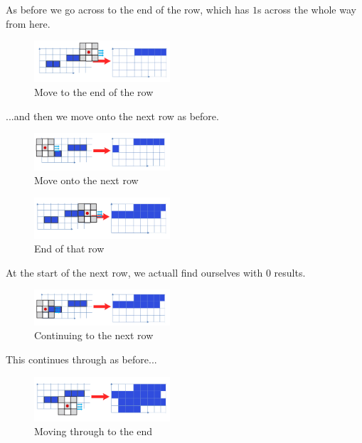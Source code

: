 \documentclass{article}
\begin{document}
As before we go across to the end of the row, which has $1$s across the whole way from here.

\begin{figure}[H]
    \centering
    \includegraphics[width = 0.45\textwidth]{imgs/5/b3.png}
    \caption{Move to the end of the row}
    \label{fig:b3}
\end{figure}

...and then we move onto the next row as before.

\begin{figure}[H]
    \centering
    \includegraphics[width = 0.45\textwidth]{imgs/5/b4.png}
    \caption{Move onto the next row}
    \label{fig:b4}
\end{figure}

\begin{figure}[H]
    \centering
    \includegraphics[width = 0.45\textwidth]{imgs/5/b5.png}
    \caption{End of that row}
    \label{fig:b5}
\end{figure}

At the start of the next row, we actuall find ourselves with $0$ results.

\begin{figure}[H]
    \centering
    \includegraphics[width = 0.45\textwidth]{imgs/5/b6.png}
    \caption{Continuing to the next row}
    \label{fig:b6}
\end{figure}

This continues through as before...

\begin{figure}[H]
    \centering
    \includegraphics[width = 0.45\textwidth]{imgs/5/b7.png}
    \caption{Moving through to the end}
    \label{fig:b7}
\end{figure}
\end{document}
